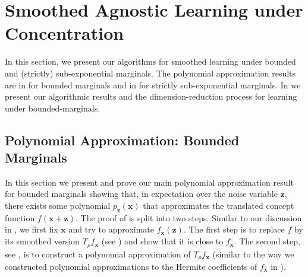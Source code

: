 \documentclass[10pt,a4paper]{article}
\renewcommand\vec[1]{\mathbf{#1}}
\newcommand{\1}{\Ind}
\newcommand{\x}{\vec x}
\newcommand{\z}{\vec z}
\begin{document}
\section{Smoothed Agnostic Learning under Concentration}
\label{sec:3}
In this section, we present our algorithms for smoothed learning under bounded 
and (strictly) sub-exponential marginals. The polynomial approximation results are in  for bounded marginals and in  for strictly sub-exponential marginals. In 
 we present our algorithmic results and the dimension-reduction process for learning under bounded-marginals.

\subsection{Polynomial Approximation: Bounded Marginals}
\label{subsec:3.1}

In this section we present and prove our main polynomial approximation
result for bounded marginals showing that, in expectation over the noise variable $\vec z$,
there exists some polynomial $p_{\vec z}(\x)$ that approximates the
translated concept function $f(\vec x + \vec z)$.  The proof of 
is split into two steps. 
Similar to our discussion in , we first fix $\x$ and try to approximate $f_{\x}(\z)$.
The first step is to replace $f$ by its smoothed version $T_\rho f_{\x}$ (see ) and 
show that it is close to $f_{\x}$. 
The second step, see , 
is to construct a polynomial approximation of $T_\rho f_{\x}$ (similar to the way we constructed polynomial approximations to the Hermite coefficients of $f_\x$ in ).
\end{document}
